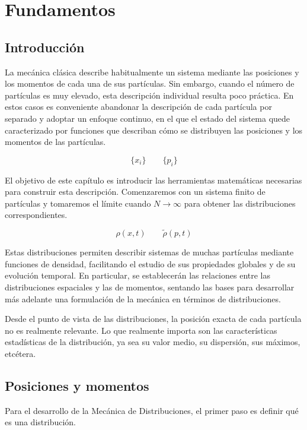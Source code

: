 \chapter{Fundamentos}
\label{cap:fundamentos}


\section{Introducción}

La mecánica clásica describe habitualmente un sistema mediante las posiciones y los momentos de cada una de sus partículas. Sin embargo, cuando el número de partículas es muy elevado, esta descripción individual resulta poco práctica. En estos casos es conveniente abandonar la descripción de cada partícula por separado y adoptar un enfoque continuo, en el que el estado del sistema quede caracterizado por funciones que describan cómo se distribuyen las posiciones y los momentos de las partículas.

\[\{x_i\}\qquad \{p_i\}\]

El objetivo de este capítulo es introducir las herramientas matemáticas necesarias para construir esta descripción. Comenzaremos con un sistema finito de partículas y tomaremos el límite cuando $N\to\infty$ para obtener las distribuciones correspondientes.

\[\rho(x,t)\qquad\tilde\rho(p,t)\]

Estas distribuciones permiten describir sistemas de muchas partículas mediante funciones de densidad, facilitando el estudio de sus propiedades globales y de su evolución temporal. En particular, se establecerán las relaciones entre las distribuciones espaciales y las de momentos, sentando las bases para desarrollar más adelante una formulación de la mecánica en términos de distribuciones.

Desde el punto de vista de las distribuciones, la posición exacta de cada partícula no es realmente relevante. Lo que realmente importa son las características estadísticas de la distribución, ya sea su valor medio, su dispersión, sus máximos, etcétera.



\newpage\section{Posiciones y momentos}

Para el desarrollo de la Mecánica de Distribuciones, el primer paso es definir qué es una distribución. 

